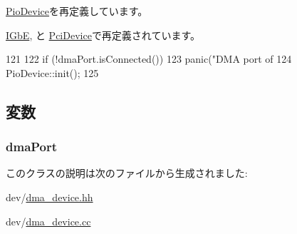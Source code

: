 \hyperlink{classPioDevice_a02fd73d861ef2e4aabb38c0c9ff82947}{PioDevice}を再定義しています。

\hyperlink{classIGbE_a02fd73d861ef2e4aabb38c0c9ff82947}{IGbE}, と \hyperlink{classPciDevice_a02fd73d861ef2e4aabb38c0c9ff82947}{PciDevice}で再定義されています。


\begin{DoxyCode}
121 {
122     if (!dmaPort.isConnected())
123         panic("DMA port of %
124     PioDevice::init();
125 }
\end{DoxyCode}


\subsection{変数}
\hypertarget{classDmaDevice_a0e844de222006d2f1aadb8f01d8f383b}{
\subsubsection[{dmaPort}]{ {\bf dmaPort}}}
\label{classDmaDevice_a0e844de222006d2f1aadb8f01d8f383b}


このクラスの説明は次のファイルから生成されました:\begin{DoxyCompactItemize}
\item 
dev/\hyperlink{dma__device_8hh}{dma\_\-device.hh}\item 
dev/\hyperlink{dma__device_8cc}{dma\_\-device.cc}\end{DoxyCompactItemize}
